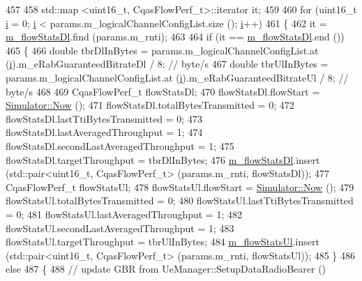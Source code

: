 \begin{DoxyCode}
457 
458   std::map <uint16\_t, CqasFlowPerf\_t>::iterator it;
459 
460   \textcolor{keywordflow}{for} (uint16\_t \hyperlink{bernuolliDistribution_8m_a6f6ccfcf58b31cb6412107d9d5281426}{i} = 0; \hyperlink{bernuolliDistribution_8m_a6f6ccfcf58b31cb6412107d9d5281426}{i} < params.m\_logicalChannelConfigList.size (); \hyperlink{bernuolliDistribution_8m_a6f6ccfcf58b31cb6412107d9d5281426}{i}++)
461     \{
462       it = \hyperlink{classns3_1_1CqaFfMacScheduler_a1cf6c47e55cbcfb9c28b17c242bde972}{m\_flowStatsDl}.find (params.m\_rnti);
463 
464       \textcolor{keywordflow}{if} (it == \hyperlink{classns3_1_1CqaFfMacScheduler_a1cf6c47e55cbcfb9c28b17c242bde972}{m\_flowStatsDl}.end ())
465         \{
466           \textcolor{keywordtype}{double} tbrDlInBytes = params.m\_logicalChannelConfigList.at (\hyperlink{bernuolliDistribution_8m_a6f6ccfcf58b31cb6412107d9d5281426}{i}).m\_eRabGuaranteedBitrateDl / 8;   \textcolor{comment}{
      // byte/s}
467           \textcolor{keywordtype}{double} tbrUlInBytes = params.m\_logicalChannelConfigList.at (\hyperlink{bernuolliDistribution_8m_a6f6ccfcf58b31cb6412107d9d5281426}{i}).m\_eRabGuaranteedBitrateUl / 8;   \textcolor{comment}{
      // byte/s}
468 
469           CqasFlowPerf\_t flowStatsDl;
470           flowStatsDl.flowStart = \hyperlink{classns3_1_1Simulator_ac3178fa975b419f7875e7105be122800}{Simulator::Now} ();
471           flowStatsDl.totalBytesTransmitted = 0;
472           flowStatsDl.lastTtiBytesTransmitted = 0;
473           flowStatsDl.lastAveragedThroughput = 1;
474           flowStatsDl.secondLastAveragedThroughput = 1;
475           flowStatsDl.targetThroughput = tbrDlInBytes;
476           \hyperlink{classns3_1_1CqaFfMacScheduler_a1cf6c47e55cbcfb9c28b17c242bde972}{m\_flowStatsDl}.insert (std::pair<uint16\_t, CqasFlowPerf\_t> (params.m\_rnti, 
      flowStatsDl));
477           CqasFlowPerf\_t flowStatsUl;
478           flowStatsUl.flowStart = \hyperlink{classns3_1_1Simulator_ac3178fa975b419f7875e7105be122800}{Simulator::Now} ();
479           flowStatsUl.totalBytesTransmitted = 0;
480           flowStatsUl.lastTtiBytesTransmitted = 0;
481           flowStatsUl.lastAveragedThroughput = 1;
482           flowStatsUl.secondLastAveragedThroughput = 1;
483           flowStatsUl.targetThroughput = tbrUlInBytes;
484           \hyperlink{classns3_1_1CqaFfMacScheduler_ab5815a4876dc296d83b3d2d633418312}{m\_flowStatsUl}.insert (std::pair<uint16\_t, CqasFlowPerf\_t> (params.m\_rnti, 
      flowStatsUl));
485         \}
486       \textcolor{keywordflow}{else}
487         \{
488           \textcolor{comment}{// update GBR from UeManager::SetupDataRadioBearer ()}

\end{DoxyCode}
